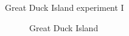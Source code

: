 \documentclass[presentation, bigger]{beamer}
\begin{document}
\begin{frame}[label=sec-1-4]{Great Duck Island experiment I}
\centering
\begin{figure}
\caption{Great Duck Island}
\end{figure}

\end{frame}
\end{document}
